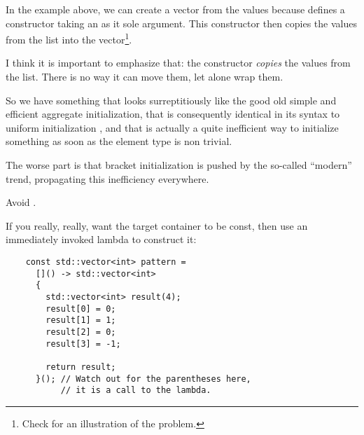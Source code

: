 In the example above, we can create a vector from the values because
 defines a constructor taking an
 as it sole argument. This constructor
then copies the values from the list into the vector\footnote{Check
  \cite{beware-of-copies-initializer-list} for an illustration of the
  problem.}.

\bigskip

I think it is important to emphasize that: the constructor
\emph{copies} the values from the list. There is no way it can move
them, let alone wrap them.

\bigskip

So we have something that looks surreptitiously like the good old
simple and efficient aggregate initialization, that is consequently
identical in its syntax to uniform initialization
, and that is actually a quite
inefficient way to initialize something as soon as the element type is
non trivial.

The worse part is that bracket initialization is pushed by the
so-called ``modern'' \cpp{} trend, propagating this inefficiency
everywhere.

\begin{guideline}
  Avoid .

  If you really, really, want the target container to be const, then
  use an immediately invoked lambda to construct it:

  \begin{lstlisting}
    const std::vector<int> pattern =
      []() -> std::vector<int>
      {
        std::vector<int> result(4);
        result[0] = 0;
        result[1] = 1;
        result[2] = 0;
        result[3] = -1;

        return result;
      }(); // Watch out for the parentheses here,
           // it is a call to the lambda.
  \end{lstlisting}
\end{guideline}

